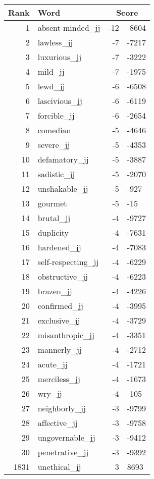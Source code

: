 \begin{longtable}[!htbp]{| rlr@{.}l |}
    \hline
    \textbf{Rank} & \textbf{Word} & \multicolumn{2}{c|}{\textbf{Score}} \\
    \hline
    \endhead
    1 & absent-minded\_jj & -12 & -8604 \\
    2 & lawless\_jj & -7 & -7217 \\
    3 & luxurious\_jj & -7 & -3222 \\
    4 & mild\_jj & -7 & -1975 \\
    5 & lewd\_jj & -6 & -6508 \\
    6 & lascivious\_jj & -6 & -6119 \\
    7 & forcible\_jj & -6 & -2654 \\
    8 & comedian & -5 & -4646 \\
    9 & severe\_jj & -5 & -4353 \\
    10 & defamatory\_jj & -5 & -3887 \\
    11 & sadistic\_jj & -5 & -2070 \\
    12 & unshakable\_jj & -5 & -927 \\
    13 & gourmet & -5 & -15 \\
    14 & brutal\_jj & -4 & -9727 \\
    15 & duplicity & -4 & -7631 \\
    16 & hardened\_jj & -4 & -7083 \\
    17 & self-respecting\_jj & -4 & -6229 \\
    18 & obstructive\_jj & -4 & -6223 \\
    19 & brazen\_jj & -4 & -4226 \\
    20 & confirmed\_jj & -4 & -3995 \\
    21 & exclusive\_jj & -4 & -3729 \\
    22 & misanthropic\_jj & -4 & -3351 \\
    23 & mannerly\_jj & -4 & -2712 \\
    24 & acute\_jj & -4 & -1721 \\
    25 & merciless\_jj & -4 & -1673 \\
    26 & wry\_jj & -4 & -105 \\
    27 & neighborly\_jj & -3 & -9799 \\
    28 & affective\_jj & -3 & -9758 \\
    29 & ungovernable\_jj & -3 & -9412 \\
    30 & penetrative\_jj & -3 & -9392 \\
    1831 & unethical\_jj & 3 & 8693 \\

\end{longtable}
